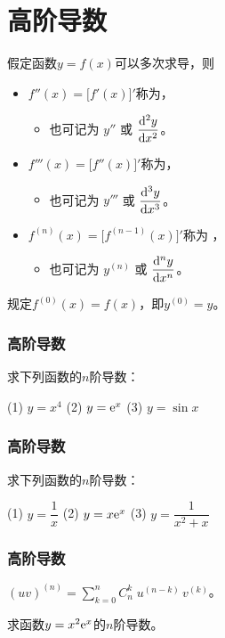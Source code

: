 \documentclass[14pt,notheorems,leqno,xcolor={rgb}]{beamer} %
\begin{document}
\section{高阶导数}

\begin{frame}
\begin{definition}
假定函数$y=f(x)$可以多次求导，则
\begin{itemize}[<+->]
  \item $f''(x)=\big[f'(x)\big]'$称为，
  \begin{itemize}
      \item 也可记为 $y''$ 或 $\dfrac{\mathop{}\!\mathrm{d}{}^2y}{\mathop{}\!\mathrm{d} x^2}$。
  \end{itemize}
  \item$f'''(x)=\big[f''(x)\big]'$称为，
  \begin{itemize}
      \item 也可记为 $y'''$ 或 $\dfrac{\mathop{}\!\mathrm{d}{}^3y}{\mathop{}\!\mathrm{d} x^3}$。
  \end{itemize}
  \item $f^{(n)}(x)=\big[f^{(n-1)}(x)\big]'$称为 ，
  \begin{itemize}
      \item 也可记为 $y^{(n)}$ 或 $\dfrac{\mathop{}\!\mathrm{d}{}^ny}{\mathop{}\!\mathrm{d} x^n}$。
  \end{itemize}
\end{itemize}
\end{definition}
\pause
\begin{remark*}
规定$f^{(0)}(x)=f(x)$，即$y^{(0)}=y$。
\end{remark*}
\end{frame}

\begin{frame}
\frametitle{高阶导数}
\begin{example}
求下列函数的$n$阶导数：\par
(1) $y=x^4$ \qquad (2) $y=\mathrm{e}^x$ \qquad (3) $y=\sin x$
\end{example}
\end{frame}

\begin{iframe}
\frametitle{高阶导数}
\begin{example}
求下列函数的$n$阶导数：\par
(1) $y=\dfrac1x$ \qquad (2) $y=x\mathrm{e}^x$ \qquad (3) $y=\dfrac1{x^2+x}$
\end{example}
\end{iframe}

\begin{frame}
\frametitle{高阶导数}
\quad $(uv)^{(n)}=\sum\limits_{k=0}^n C_n^k\;u^{(n-k)}\,v^{(k)}$。
\vpause
\begin{example}
求函数$y=x^2\mathrm{e}^x$的$n$阶导数。
\end{example}
\end{frame}
\end{document}
